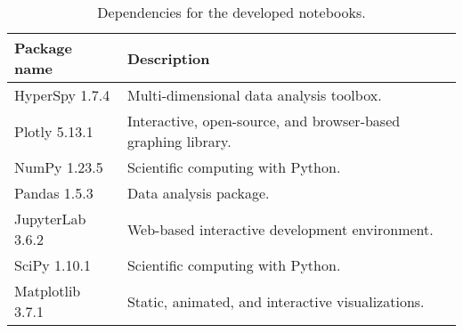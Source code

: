 \begin{table}[hbtp]
    \begin{center}
        \caption{
            Dependencies for the developed notebooks.
        }
        \renewcommand*{\arraystretch}{1.2}
        \label{tab:method:packages}
        \begin{tabular}{p{4cm}p{10.6cm}}
            \hline
            \textbf{Package name} & \textbf{Description}                                          \\
            \hline
            HyperSpy 1.7.4        & Multi-dimensional data analysis toolbox.                      \\
            Plotly 5.13.1         & Interactive, open-source, and browser-based graphing library. \\
            NumPy 1.23.5          & Scientific computing with Python.                             \\
            Pandas 1.5.3          & Data analysis package.                                        \\
            JupyterLab 3.6.2      & Web-based interactive development environment.                \\
            SciPy 1.10.1          & Scientific computing with Python.                             \\
            Matplotlib 3.7.1      & Static, animated, and interactive visualizations.             \\
            \hline
        \end{tabular}
    \end{center}
\end{table}